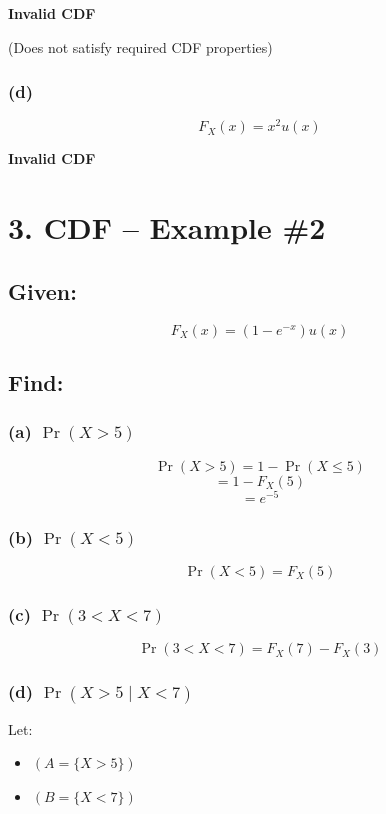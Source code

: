 \documentclass[12pt]{article}
\begin{document}
\textbf{Invalid CDF}

(Does not satisfy required CDF properties)

\subsubsection*{(d)}

\[
F_X(x) = x^2 u(x)
\]

\textbf{Invalid CDF}

\section*{3. CDF -- Example \#2}

\subsection*{Given:}

\[
F_X(x) = (1 - e^{-x})u(x)
\]

\subsection*{Find:}

\subsubsection*{(a) $\Pr(X > 5)$}

\[
\Pr(X > 5) = 1 - \Pr(X \le 5)
\]
\[
= 1 - F_X(5)
\]
\[
= e^{-5}
\]

\subsubsection*{(b) $\Pr(X < 5)$}

\[
\Pr(X < 5) = F_X(5)
\]

\subsubsection*{(c) $\Pr(3 < X < 7)$}

\[
\Pr(3 < X < 7) = F_X(7) - F_X(3)
\]

\subsubsection*{(d) $\Pr(X > 5 \mid X < 7)$}

Let:

\begin{itemize}
\item $(A = \{X > 5\})$
\item $(B = \{X < 7\})$
\end{itemize}
\end{document}
